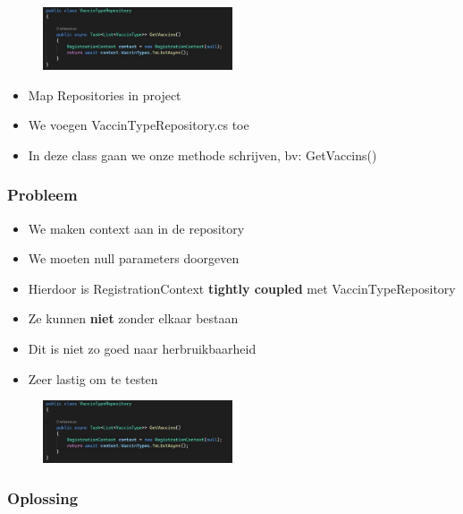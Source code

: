 \documentclass{article}
\begin{document}
\begin{figure}[H]
    \centering
    \includegraphics[width=0.5\textwidth]{repositories-1.png}
\end{figure}

\begin{itemize}
    \item Map Repositories in project
    \item We voegen VaccinTypeRepository.cs toe
    \item In deze class gaan we onze methode schrijven, bv: GetVaccins()
\end{itemize}

\subsubsection{Probleem}

\begin{itemize}
    \item We maken context aan in de repository
    \item We moeten null parameters doorgeven
    \item Hierdoor is RegistrationContext \textbf{tightly coupled} met VaccinTypeRepository
    \item Ze kunnen \textbf{niet} zonder elkaar bestaan
    \item Dit is niet zo goed naar herbruikbaarheid
    \item Zeer lastig om te testen
\end{itemize}

\begin{figure}[H]
    \centering
    \includegraphics[width=0.5\textwidth]{repositories-2.png}
    \caption{}
\end{figure}


\subsubsection{Oplossing}
\end{document}
